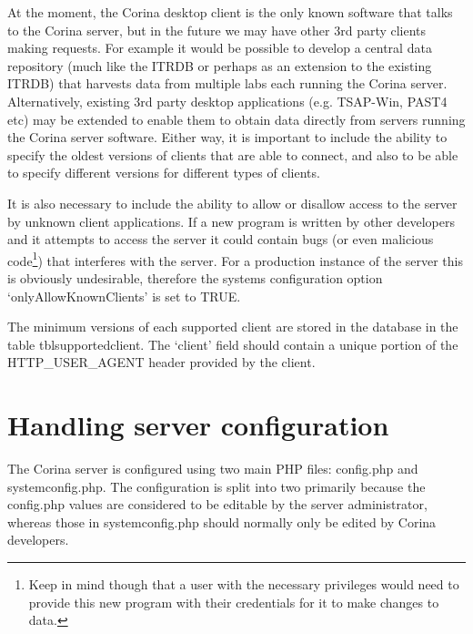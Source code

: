At the moment, the Corina desktop client is the only known software that talks to the Corina server, but in the future we may have other 3rd party clients making requests.  For example it would be possible to develop a central data repository (much like the ITRDB or perhaps as an extension to the existing ITRDB) that harvests data from multiple labs each running the Corina server. Alternatively, existing 3rd party desktop applications (e.g. TSAP-Win, PAST4 etc) may be extended to enable them to obtain data directly from servers running the Corina server software.  Either way, it is important to include the ability to specify the oldest versions of clients that are able to connect, and also to be able to specify different versions for different types of clients. 

It is also necessary to include the ability to allow or disallow access to the server by unknown client applications.  If a new program is written by other developers and it attempts to access the server it could contain bugs (or even malicious code\footnote{Keep in mind though that a user with the necessary privileges would need to provide this new program with their credentials for it to make changes to data.}) that interferes with the server.  For a production instance of the server this is obviously undesirable, therefore the systems configuration option `onlyAllowKnownClients' is set to TRUE.  

The minimum versions of each supported client are stored in the database in the table tblsupportedclient.  The `client' field should contain a unique portion of the HTTP\_USER\_AGENT header provided by the client.  


\section{Handling server configuration}
The Corina server is configured using two main PHP files: config.php and systemconfig.php.  The configuration is split into two primarily because the config.php values are considered to be editable by the server administrator, whereas those in systemconfig.php should normally only be edited by Corina developers.  

